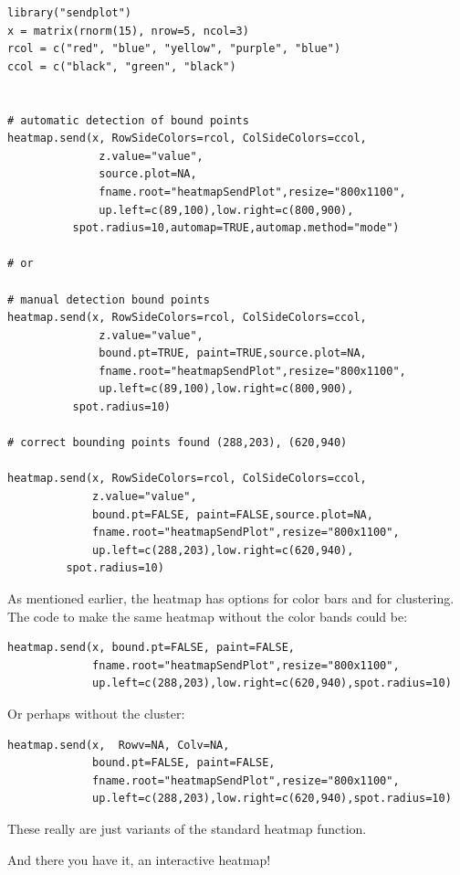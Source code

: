 \documentclass[]{article}
\begin{document}
\begin{verbatim}
library("sendplot")
x = matrix(rnorm(15), nrow=5, ncol=3)
rcol = c("red", "blue", "yellow", "purple", "blue")
ccol = c("black", "green", "black")


# automatic detection of bound points
heatmap.send(x, RowSideColors=rcol, ColSideColors=ccol,
              z.value="value",
              source.plot=NA,
              fname.root="heatmapSendPlot",resize="800x1100",
              up.left=c(89,100),low.right=c(800,900),
	      spot.radius=10,automap=TRUE,automap.method="mode")

# or 

# manual detection bound points
heatmap.send(x, RowSideColors=rcol, ColSideColors=ccol,
              z.value="value",
              bound.pt=TRUE, paint=TRUE,source.plot=NA,
              fname.root="heatmapSendPlot",resize="800x1100",
              up.left=c(89,100),low.right=c(800,900),
	      spot.radius=10)

# correct bounding points found (288,203), (620,940)

heatmap.send(x, RowSideColors=rcol, ColSideColors=ccol,
             z.value="value",
             bound.pt=FALSE, paint=FALSE,source.plot=NA,
             fname.root="heatmapSendPlot",resize="800x1100",
             up.left=c(288,203),low.right=c(620,940),
	     spot.radius=10)

\end{verbatim}

As mentioned earlier, the heatmap has options for color bars and for clustering. The code to make the same heatmap without the color bands could be:

\begin{verbatim}
heatmap.send(x, bound.pt=FALSE, paint=FALSE, 
             fname.root="heatmapSendPlot",resize="800x1100",
             up.left=c(288,203),low.right=c(620,940),spot.radius=10)
\end{verbatim}

Or perhaps without the cluster:

\begin{verbatim}
heatmap.send(x,  Rowv=NA, Colv=NA, 
             bound.pt=FALSE, paint=FALSE, 
             fname.root="heatmapSendPlot",resize="800x1100",
             up.left=c(288,203),low.right=c(620,940),spot.radius=10)
\end{verbatim}

These really are just variants of the standard heatmap function. 


And there you have it, an interactive heatmap! 
\end{document}
